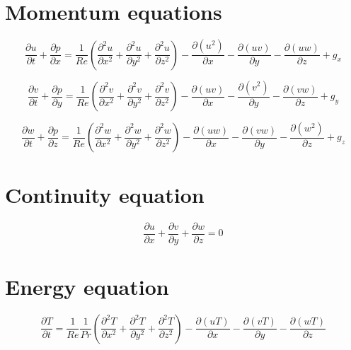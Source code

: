 \documentclass[10pt]{article}
\begin{document}
\section{Momentum equations}

\begin{equation}
\frac{\partial u}{\partial t} + \frac{\partial p}{\partial x} = 
\frac{1}{Re} \left( \frac{\partial^2 u}{\partial x^2} + \frac{\partial^2 u}{\partial y^2} + \frac{\partial^2 u}{\partial z^2} \right) - 
\frac{\partial(u^2)}{\partial x} -\frac{\partial (uv)}{\partial y} - 
\frac{\partial (uw)}{\partial z} +
g_x 
\end{equation}

\begin{equation}
\frac{\partial v}{\partial t} + \frac{\partial p}{\partial y} = 
\frac{1}{Re} \left( \frac{\partial^2 v}{\partial x^2} + \frac{\partial^2 v}{\partial y^2} + \frac{\partial^2 v}{\partial z^2} \right) - 
\frac{\partial(uv)}{\partial x} -\frac{\partial (v^2)}{\partial y} - 
\frac{\partial (vw)}{\partial z} +
g_y
\end{equation}

\begin{equation}
\frac{\partial w}{\partial t} + \frac{\partial p}{\partial z} = 
\frac{1}{Re} \left( \frac{\partial^2 w}{\partial x^2} + \frac{\partial^2 w}{\partial y^2} + \frac{\partial^2 w}{\partial z^2} \right) - 
\frac{\partial(uw)}{\partial x} -\frac{\partial (vw)}{\partial y} - 
\frac{\partial (w^2)}{\partial z} +
g_z
\end{equation}

\section{Continuity equation}

\begin{equation}
\frac{\partial u}{\partial x} + \frac{\partial v}{\partial y} + \frac{\partial w}{\partial z} = 0
\end{equation}

\section{Energy equation}

\begin{equation}
\frac{\partial T}{\partial t} = 
\frac{1}{Re} \frac{1}{Pr} \left( \frac{\partial^2 T}{\partial x^2} + \frac{\partial^2 T}{\partial y^2} + \frac{\partial^2 T}{\partial z^2} \right) - 
\frac{\partial(uT)}{\partial x} -\frac{\partial (vT)}{\partial y} - 
\frac{\partial (wT)}{\partial z}
\end{equation}
\end{document}
